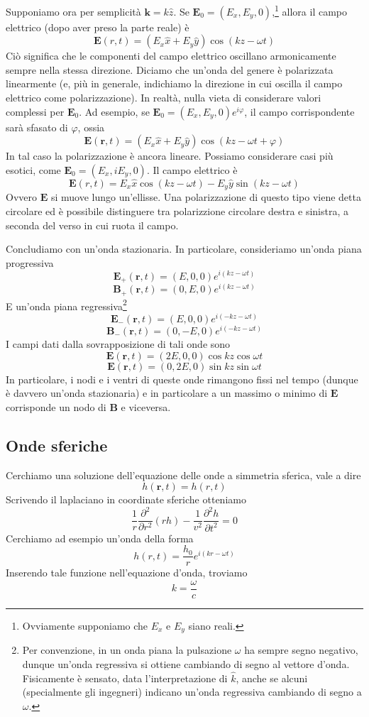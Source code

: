 \documentclass[a4paper,11pt]{book}
\newcommand{\der}[3][]{\frac{\partial ^{#1}#2}{\partial {#3}^{#1}}}
\renewcommand{\vec}[1]{\mathbf{#1}}
\theoremstyle{theorem}
\theoremstyle{definition}
\begin{document}
Supponiamo ora per semplicità $\vec{k}=k\hat{z}$. Se $\vec{E}_0=(E_x,E_y,0)$,\footnote{Ovviamente supponiamo che $E_x$ e $E_y$ siano reali.} allora il campo elettrico (dopo aver preso la parte reale) è
\[\vec{E}(r,t)=(E_x\hat{x}+E_y\hat{y})\cos(kz-\omega t)\]
Ciò significa che le componenti del campo elettrico oscillano armonicamente sempre nella stessa direzione. Diciamo che un'onda del genere è polarizzata linearmente (e, più in generale, indichiamo la direzione in cui oscilla il campo elettrico come polarizzazione). In realtà, nulla vieta di considerare valori complessi per $\vec{E}_0$. Ad esempio, se $\vec{E}_0=(E_x,E_y,0)e^{i\varphi}$, il campo corrispondente sarà sfasato di $\varphi$, ossia
\[\vec{E}(\vec{r},t)=(E_x\hat{x}+E_y\hat{y})\cos(kz-\omega t+\varphi)\]
In tal caso la polarizzazione è ancora lineare. Possiamo considerare casi più esotici, come $\vec{E}_0=(E_x,iE_y,0)$. Il campo elettrico è
\[\vec{E}(r,t)=E_x\hat{x}\cos(kz-\omega t)-E_y\hat{y}\sin(kz-\omega t)\]
Ovvero $\vec{E}$ si muove lungo un'ellisse. Una polarizzazione di questo tipo viene detta circolare ed è possibile distinguere tra polarizzione circolare destra e sinistra, a seconda del verso in cui ruota il campo.

Concludiamo con un'onda stazionaria. In particolare, consideriamo un'onda piana progressiva
\[\vec{E}_+(\vec{r},t)=(E,0,0)e^{i(kz-\omega t)}\]
\[\vec{B}_+(\vec{r},t)=(0,E,0)e^{i(kz-\omega t)}\]
E un'onda piana regressiva\footnote{Per convenzione, in un onda piana la pulsazione $\omega$ ha sempre segno negativo, dunque un'onda regressiva si ottiene cambiando di segno al vettore d'onda. Fisicamente è sensato, data l'interpretazione di $\hat{k}$, anche se alcuni (specialmente gli ingegneri) indicano un'onda regressiva cambiando di segno a $\omega$.}
\[\vec{E}_-(\vec{r},t)=(E,0,0)e^{i(-kz-\omega t)}\]
\[\vec{B}_-(\vec{r},t)=(0,-E,0)e^{i(-kz-\omega t)}\]
I campi dati dalla sovrapposizione di tali onde sono
\[\vec{E}(\vec{r},t)=(2E,0,0)\cos kz\cos\omega t\]
\[\vec{E}(\vec{r},t)=(0,2E,0)\sin kz\sin\omega t\]
In particolare, i nodi e i ventri di queste onde rimangono fissi nel tempo (dunque è davvero un'onda stazionaria) e in particolare a un massimo o minimo di $\vec{E}$ corrisponde un nodo di $\vec{B}$ e viceversa.
\subsection{Onde sferiche}
Cerchiamo una soluzione dell'equazione delle onde a simmetria sferica, vale a dire
\[h(\vec{r},t)=h(r,t)\]
Scrivendo il laplaciano in coordinate sferiche otteniamo
\[\frac{1}{r}\der[2]{}{r}\left(rh\right)-\frac{1}{v^2}\der[2]{h}{t}=0\]
Cerchiamo ad esempio un'onda della forma
\[h(r,t)=\frac{h_0}{r}e^{i(kr-\omega t)}\]
Inserendo tale funzione nell'equazione d'onda, troviamo
\[k=\frac{\omega}{c}\]
\end{document}
